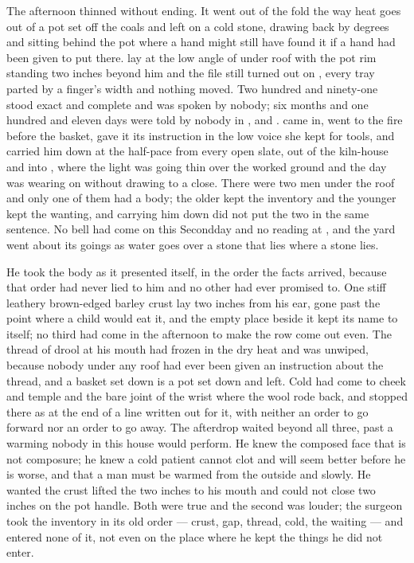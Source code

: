 The afternoon thinned without ending. It went out of the fold the way heat goes out of a pot set off the coals and left on a cold stone, drawing back by degrees and sitting behind the pot where a hand might still have found it if a hand had been given to put there.  lay at the low angle of  under  roof with the pot rim standing two inches beyond him and the file still turned out on , every tray parted by a finger's width and nothing moved. Two hundred and ninety-one stood exact and complete and was spoken by nobody; six months and one hundred and eleven days were told by nobody in ,  and .  came in, went to the fire before the basket, gave it its instruction in the low voice she kept for tools, and carried him down at the half-pace from every open slate, out of the kiln-house and into , where the light was going thin over the worked ground and the day was wearing on without drawing to a close. There were two men under the roof and only one of them had a body; the older kept the inventory and the younger kept the wanting, and carrying him down did not put the two in the same sentence. No bell had come on this Secondday and no reading at , and the yard went about its goings as water goes over a stone that lies where a stone lies.

He took the body as it presented itself, in the order the facts arrived, because that order had never lied to him and no other had ever promised to. One stiff leathery brown-edged barley crust lay two inches from his ear, gone past the point where a child would eat it, and the empty place beside it kept its name to itself; no third had come in the afternoon to make the row come out even. The thread of drool at his mouth had frozen in the dry heat and was unwiped, because nobody under any roof had ever been given an instruction about the thread, and a basket set down is a pot set down and left. Cold had come to cheek and temple and the bare joint of the wrist where the wool rode back, and stopped there as at the end of a line written out for it, with neither an order to go forward nor an order to go away. The afterdrop waited beyond all three, past a warming nobody in this house would perform. He knew the composed face that is not composure; he knew a cold patient cannot clot and will seem better before he is worse, and that a man must be warmed from the outside and slowly. He wanted the crust lifted the two inches to his mouth and could not close two inches on the pot handle. Both were true and the second was louder; the surgeon took the inventory in its old order --- crust, gap, thread, cold, the waiting --- and entered none of it, not even on the place where he kept the things he did not enter.

